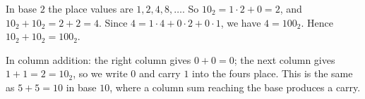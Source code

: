 In base $2$ the place values are $1,2,4,8,\dots$. So $10_2=1\cdot2+0=2$, and $10_2+10_2=2+2=4$. Since $4=1\cdot4+0\cdot2+0\cdot1$, we have $4=100_2$. Hence $\boxed{10_2+10_2=100_2}$.

In column addition: the right column gives $0+0=0$; the next column gives $1+1=2=10_2$, so we write $0$ and carry $1$ into the fours place. This is the same as $5+5=10$ in base $10$, where a column sum reaching the base produces a carry.
